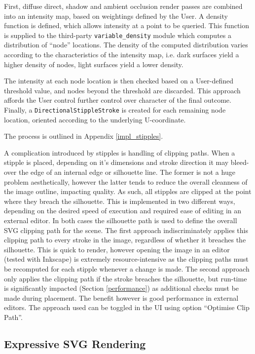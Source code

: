 {First, diffuse direct, shadow and ambient occlusion render passes are combined into an intensity map, based on weightings defined by the User.
A density function is defined, which allows intensity at a point to be queried.
This function is supplied to the third-party \texttt{variable\_density} module which computes a distribution of ``node'' locations.
The density of the computed distribution varies according to the characteristics of the intensity map, i.e. dark surfaces yield a higher density of nodes, light surfaces yield a lower density.

The intensity at each node location is then checked based on a User-defined threshold value, and nodes beyond the threshold are discarded.
This approach affords the User control further control over character of the final outcome.
Finally, a \texttt{DirectionalStippleStroke} is created for each remaining node location, oriented according to the underlying U-coordinate.

The process is outlined in Appendix \ref{impl_stipples}.

A complication introduced by stipples is handling of clipping paths.
When a stipple is placed, depending on it's dimensions and stroke direction it may bleed-over the edge of an internal edge or silhouette line.
The former is not a huge problem aesthetically, however the latter tends to reduce the overall cleanness of the image outline, impacting quality.
As such, all stipples are clipped at the point where they breach the silhouette.
This is implemented in two different ways, depending on the desired speed of execution and required ease of editing in an external editor.
In both cases the silhouette path is used to define the overall SVG clipping path for the scene.
The first approach indiscriminately applies this clipping path to every stroke in the image, regardless of whether it breaches the silhouette.
This is quick to render, however opening the image in an editor (tested with Inkscape) is extremely resource-intensive as the clipping paths must be recomputed for each stipple whenever a change is made.
The second approach only applies the clipping path if the stroke breaches the silhouette, but run-time is significantly impacted (Section \ref{performance}) as additional checks must be made during placement.
The benefit however is good performance in external editors.
The approach used can be toggled in the UI using option ``Optimise Clip Path''.

\subsection{Expressive SVG Rendering}

}
